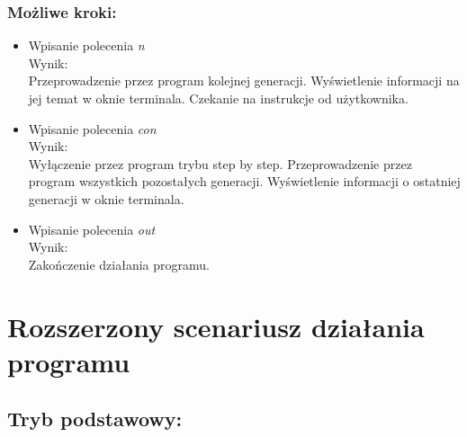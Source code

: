 \documentclass[11pt,a4paper]{report}
\begin{document}
\subsubsection {Możliwe kroki:}
\begin {itemize}
\item Wpisanie polecenia \textsl {n}\\
		Wynik:\\
		Przeprowadzenie przez program kolejnej generacji. Wyświetlenie informacji na jej temat w oknie terminala. Czekanie na instrukcje od użytkownika.
\item Wpisanie polecenia \textsl {con}\\
		Wynik:\\
		Wyłączenie przez program trybu step by step. Przeprowadzenie przez program wszystkich pozostałych generacji.
		Wyświetlenie informacji o ostatniej generacji w oknie terminala.
\item Wpisanie polecenia \textsl{out}\\
		Wynik:\\
		Zakończenie działania programu.\\
\end{itemize}

\section {Rozszerzony scenariusz działania programu}\label{sec:teskt}
\subsection[Tryb podstawowy] {Tryb podstawowy:}
\end{document}
